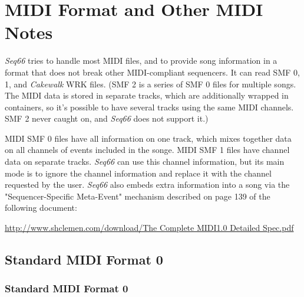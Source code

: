 %
%
%

\section{MIDI Format and Other MIDI Notes}
\label{sec:midi_format_and_midi_notes}

   \textsl{Seq66} tries to handle most MIDI files, and to provide
   song information in a format that does not break other MIDI-compliant
   sequencers.  It can read SMF 0, 1, and \textsl{Cakewalk} WRK files.
   (SMF 2 is a series of SMF 0 files for multiple songs.  The MIDI data is
   stored in separate tracks, which are additionally wrapped in containers, so
   it's possible to have several tracks using the same MIDI channels. SMF 2
   never caught on, and \textsl{Seq66} does not support it.)

   MIDI SMF 0 files have all information on one track, which mixes together
   data on all channels of events included in the songe.
   MIDI SMF 1 files have channel data on separate tracks.
   \textsl{Seq66} can use this channel information, but its main mode is to
   ignore the channel information and replace it with the channel requested by
   the user.
   \textsl{Seq66} also embeds extra information into a song via the
   "Sequencer-Specific Meta-Event" mechanism described on page 139 of the
   following document:

   \url{http://www.shclemen.com/download/The Complete MIDI1.0 Detailed Spec.pdf}

%

\subsection{Standard MIDI Format 0}
\label{subsec:midi_format_smf_0}

\subsubsection{Standard MIDI Format 0}
\label{subsubsec:midi_format_smf_0_import}

